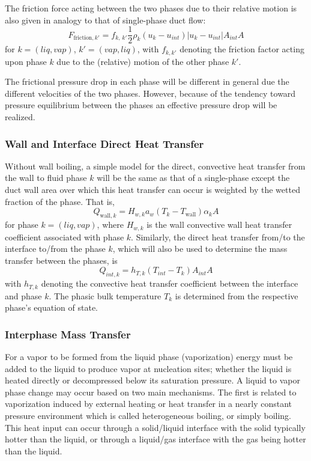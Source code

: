 The friction force acting between the two phases due to their relative
motion is also given in analogy to that of single-phase duct flow:
\begin{equation}
  F_{\text{friction}, k'} = f_{k, \, k'} \frac{1}{2} \rho_k (u_k - u_{int}) \left| u_k -u_{int} \right|  A_{int}  A
\end{equation}
for $k=(liq, vap)$, $k'=(vap, liq)$, with $f_{k, k'}$ denoting the friction factor acting upon phase $k$
due to the (relative) motion of the other phase $k'$. 

The frictional pressure drop in each phase will be different in 
general due the different velocities of the two phases.  However, 
because of the tendency toward pressure equilibrium between the phases 
an effective pressure drop will be realized.


\subsubsection{Wall and Interface Direct Heat Transfer}
Without wall boiling, a simple model for the direct, convective heat transfer
from the wall to fluid phase $k$ will be the same as that of a single-phase
except the duct wall area over which this heat transfer can occur is weighted
by the wetted fraction of the phase.  That is,
\begin{equation}
  Q_{ \text{wall}, k } = H_{w,k} a_w \left(T_k  - T_{ \text{wall} } \right) \alpha_k A
\end{equation}
for phase $k=(liq, vap)$, where $H_{w,k}$ is the wall convective wall heat transfer
coefficient associated with phase $k$.  Similarly, the direct heat
transfer from/to the interface to/from the phase $k$, which will also
be used to determine the mass transfer between the phases, is
\begin{equation}
  Q_{int,  k} = h_{T,  k}  \left( T_{int} - T_k \right)  A_{int}  A
\end{equation}
with $h_{T,  k}$ denoting the convective heat transfer coefficient
between the interface and phase $k$. The phasic bulk
temperature $T_k$ is determined from the respective phase's equation of
state.


\subsubsection{Interphase Mass Transfer}
For a vapor to be formed from the liquid phase (vaporization) energy
must be added to the liquid to produce vapor at nucleation sites;
whether the liquid is heated directly or decompressed below its
saturation pressure.  A liquid to vapor phase change may occur based
on two main mechanisms.  The first is related to vaporization induced
by external heating or heat transfer in a nearly constant pressure
environment which is called heterogeneous boiling, or simply
boiling.  This heat input can occur through a solid/liquid
interface with the solid typically hotter than the liquid, or through
a liquid/gas interface with the gas being hotter than the liquid.

